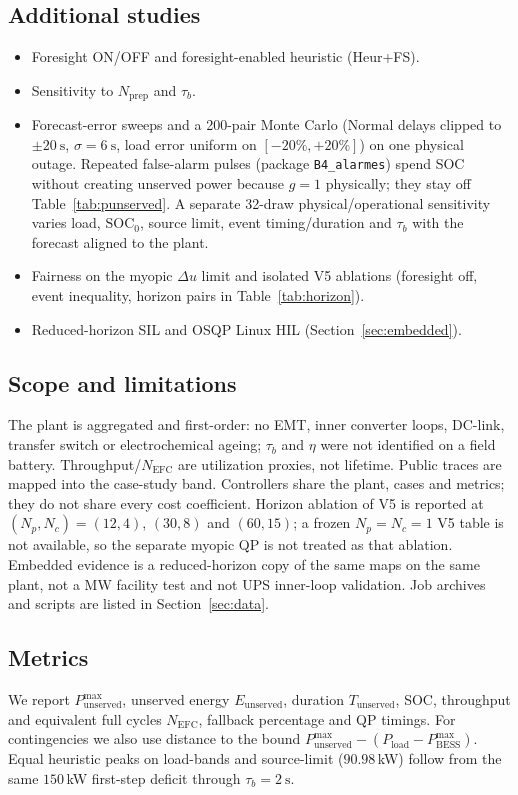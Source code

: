 \documentclass{ieeeaccess}
\begin{document}
\subsection{Additional studies}
\begin{itemize}
\item Foresight ON/OFF and foresight-enabled heuristic (Heur+FS).
\item Sensitivity to $N_{\mathrm{prep}}$ and $\tau_b$.
\item Forecast-error sweeps and a 200-pair Monte Carlo (Normal delays clipped to $\pm\SI{20}{\second}$, $\sigma=\SI{6}{\second}$, load error uniform on $[-20\%,+20\%]$) on one physical outage. Repeated false-alarm pulses (package \texttt{B4\_alarmes}) spend SOC without creating unserved power because $g{=}1$ physically; they stay off Table~\ref{tab:punserved}. A separate 32-draw physical/operational sensitivity varies load, $\mathrm{SOC}_0$, source limit, event timing/duration and $\tau_b$ with the forecast aligned to the plant.
\item Fairness on the myopic $\Delta u$ limit and isolated V5 ablations (foresight off, event inequality, horizon pairs in Table~\ref{tab:horizon}).
\item Reduced-horizon SIL and OSQP Linux HIL (Section~\ref{sec:embedded}).
\end{itemize}

\subsection{Scope and limitations}
\label{sec:inclusion}
The plant is aggregated and first-order: no EMT, inner converter loops, DC-link, transfer switch or electrochemical ageing; $\tau_b$ and $\eta$ were not identified on a field battery. Throughput/$N_{\mathrm{EFC}}$ are utilization proxies, not lifetime. Public traces are mapped into the case-study band. Controllers share the plant, cases and metrics; they do not share every cost coefficient. Horizon ablation of V5 is reported at $(N_p,N_c)=(12,4)$, $(30,8)$ and $(60,15)$; a frozen $N_p=N_c=1$ V5 table is not available, so the separate myopic QP is not treated as that ablation. Embedded evidence is a reduced-horizon copy of the same maps on the same plant, not a MW facility test and not UPS inner-loop validation. Job archives and scripts are listed in Section~\ref{sec:data}.

\subsection{Metrics}
We report $P_{\mathrm{unserved}}^{\max}$, unserved energy $E_{\mathrm{unserved}}$, duration $T_{\mathrm{unserved}}$, SOC, throughput and equivalent full cycles $N_{\mathrm{EFC}}$, fallback percentage and QP timings. For contingencies we also use distance to the bound $P_{\mathrm{unserved}}^{\max}-(P_{\mathrm{load}}-P_{\mathrm{BESS}}^{\max})$. Equal heuristic peaks on load-bands and source-limit ($90.98$\,kW) follow from the same $150$\,kW first-step deficit through $\tau_b=\SI{2}{\second}$.
\end{document}
